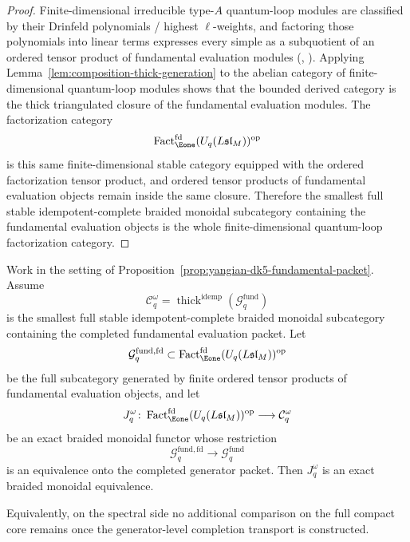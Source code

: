 \begin{proof}
Finite-dimensional irreducible type-$A$ quantum-loop modules are
classified by their Drinfeld polynomials / highest $\ell$-weights, and
factoring those polynomials into linear terms expresses every simple as
a subquotient of an ordered tensor product of fundamental evaluation
modules (\cite[Ch.~12]{ChariPressley94}, \cite[\S2]{Hernandez05}).
Applying Lemma~\ref{lem:composition-thick-generation} to the abelian
category of finite-dimensional quantum-loop modules shows that the
bounded derived category is the thick triangulated closure of the
fundamental evaluation modules. The factorization category
\[
\operatorname{Fact}_{\Eone}^{\mathrm{fd}}(U_q(L\mathfrak{sl}_M))^{\mathrm{op}}
\]
is this same finite-dimensional stable category equipped with the
ordered factorization tensor product, and ordered tensor products of
fundamental evaluation objects remain inside the same closure.
Therefore the smallest full stable idempotent-complete braided
monoidal subcategory containing the fundamental evaluation objects is
the whole finite-dimensional quantum-loop factorization category.
\end{proof}

\begin{proposition}
\label{prop:yangian-dk5-spectral-realization-formal}
Work in the setting of
Proposition~\ref{prop:yangian-dk5-fundamental-packet}. Assume
\[
\mathcal{C}_q^\omega
=
\operatorname{thick}^{\mathrm{idemp}}(\mathcal{G}^{\mathrm{fund}}_{q})
\]
is the smallest full stable idempotent-complete braided monoidal
subcategory containing the completed fundamental evaluation packet.
Let
\[
\mathcal{G}^{\mathrm{fund,fd}}_{q}
\subset
\operatorname{Fact}_{\Eone}^{\mathrm{fd}}(U_q(L\mathfrak{sl}_M))^{\mathrm{op}}
\]
be the full subcategory generated by finite ordered tensor products of
fundamental evaluation objects, and let
\[
J_q^\omega\colon
\operatorname{Fact}_{\Eone}^{\mathrm{fd}}(U_q(L\mathfrak{sl}_M))^{\mathrm{op}}
\longrightarrow
\mathcal{C}_q^\omega
\]
be an exact braided monoidal functor whose restriction
\[
\mathcal{G}^{\mathrm{fund,fd}}_{q}
\longrightarrow
\mathcal{G}^{\mathrm{fund}}_{q}
\]
is an equivalence onto the completed generator packet. Then
\(J_q^\omega\) is an exact braided monoidal equivalence.

Equivalently, on the spectral side no additional comparison on the full
compact core remains once the generator-level completion transport is
constructed.
\end{proposition}

